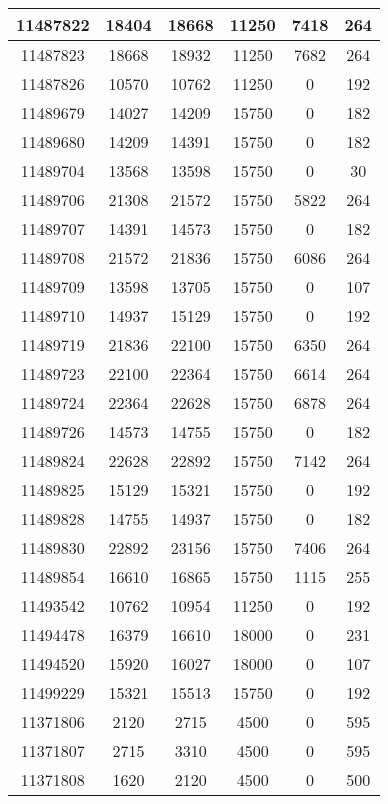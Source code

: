 \begin{appendices}
\begin{center}
\begin{longtable}{|c|c|c|c|c|c|}
11487822 & 18404 & 18668 & 11250 & 7418  & 264 \\ \hline
11487823 & 18668 & 18932 & 11250 & 7682  & 264 \\ \hline
11487826 & 10570 & 10762 & 11250 & 0     & 192 \\ \hline
11489679 & 14027 & 14209 & 15750 & 0     & 182 \\ \hline
11489680 & 14209 & 14391 & 15750 & 0     & 182 \\ \hline
11489704 & 13568 & 13598 & 15750 & 0     & 30  \\ \hline
11489706 & 21308 & 21572 & 15750 & 5822  & 264 \\ \hline
11489707 & 14391 & 14573 & 15750 & 0     & 182 \\ \hline
11489708 & 21572 & 21836 & 15750 & 6086  & 264 \\ \hline
11489709 & 13598 & 13705 & 15750 & 0     & 107 \\ \hline
11489710 & 14937 & 15129 & 15750 & 0     & 192 \\ \hline
11489719 & 21836 & 22100 & 15750 & 6350  & 264 \\ \hline
11489723 & 22100 & 22364 & 15750 & 6614  & 264 \\ \hline
11489724 & 22364 & 22628 & 15750 & 6878  & 264 \\ \hline
11489726 & 14573 & 14755 & 15750 & 0     & 182 \\ \hline
11489824 & 22628 & 22892 & 15750 & 7142  & 264 \\ \hline
11489825 & 15129 & 15321 & 15750 & 0     & 192 \\ \hline
11489828 & 14755 & 14937 & 15750 & 0     & 182 \\ \hline
11489830 & 22892 & 23156 & 15750 & 7406  & 264 \\ \hline
11489854 & 16610 & 16865 & 15750 & 1115  & 255 \\ \hline
11493542 & 10762 & 10954 & 11250 & 0     & 192 \\ \hline
11494478 & 16379 & 16610 & 18000 & 0     & 231 \\ \hline
11494520 & 15920 & 16027 & 18000 & 0     & 107 \\ \hline
11499229 & 15321 & 15513 & 15750 & 0     & 192 \\ \hline
11371806 & 2120  & 2715  & 4500  & 0     & 595 \\ \hline
11371807 & 2715  & 3310  & 4500  & 0     & 595 \\ \hline
11371808 & 1620  & 2120  & 4500  & 0     & 500 \\ \hline

\end{longtable}
\end{center}
\end{appendices}
